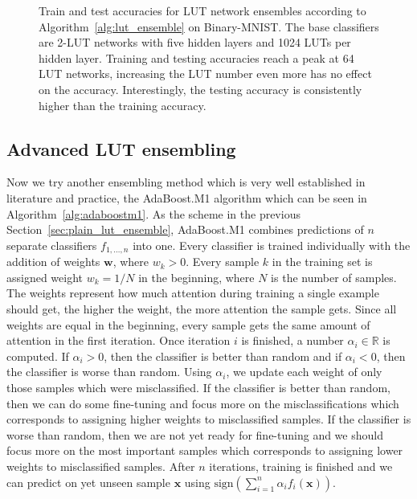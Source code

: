 \begin{figure}[!htb]
    \centering
    
    \caption{Train and test accuracies for LUT network ensembles according to Algorithm~\ref{alg:lut_ensemble} on Binary-MNIST. The base classifiers are 2-LUT networks with five hidden layers and 1024 LUTs per hidden layer. Training and testing accuracies reach a peak at 64 LUT networks, increasing the LUT number even more has no effect on the accuracy. Interestingly, the testing accuracy is consistently higher than the training accuracy.}
\label{fig:plain_lut_ensembling}
\end{figure}
\FloatBarrier

\subsection{Advanced LUT ensembling} \label{sec:ada_boost}
Now we try another ensembling method which is very well established in literature and practice, the AdaBoost.M1 algorithm \cite{bib:adaboostm1} which can be seen in Algorithm~\ref{alg:adaboostm1}. As the scheme in the previous Section~\ref{sec:plain_lut_ensemble}, AdaBoost.M1 combines predictions of $n$ separate classifiers $f_{1, \dots, n}$ into one. Every classifier is trained individually with the addition of weights $\bm{w}$, where $w_k > 0$. Every sample $k$ in the training set is assigned weight $w_k = 1/N$ in the beginning, where $N$ is the number of samples. The weights represent how much attention during training a single example should get, the higher the weight, the more attention the sample gets. Since all weights are equal in the beginning, every sample gets the same amount of attention in the first iteration. Once iteration $i$ is finished, a number $\alpha_i \in \mathds{R}$ is computed. If $\alpha_i > 0$, then the classifier is better than random and if $\alpha_i < 0$, then the classifier is worse than random. Using $\alpha_i$, we update each weight of only those samples which were misclassified. If the classifier is better than random, then we can do some fine-tuning and focus more on the misclassifications which corresponds to assigning higher weights to misclassified samples. If the classifier is worse than random, then we are not yet ready for fine-tuning and we should focus more on the most important samples which corresponds to assigning lower weights to misclassified samples. After $n$ iterations, training is finished and we can predict on yet unseen sample $\bm{x}$ using $\text{sign}(\sum_{i=1}^n \alpha_i f_i(\bm{x}))$. 

